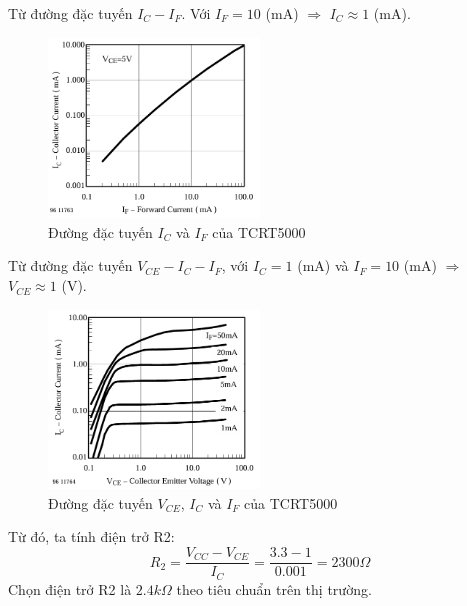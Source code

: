             \hspace*{0.6cm}Từ đường đặc tuyến $I_{C} - I_{F}$. Với $I_{F} = 10$ (mA) $\Rightarrow$ $I_{C} \approx 1$ (mA).
            \begin{figure}[H]
                \centering
                \includegraphics[width=0.5\textwidth]{pictures/chapter4/c4_p4_IC&IF.png}
                \caption{Đường đặc tuyến $I_{C}$ và $I_{F}$ của TCRT5000}
                \label{fig:4-6}
            \end{figure}
            Từ đường đặc tuyến $V_{CE} - I_{C} - I_{F}$, với $I_{C} = 1$ (mA) và $I_{F} = 10$ (mA) $\Rightarrow$ $V_{CE} \approx 1$ (V).\\
            \begin{figure}[H]
                \centering
                \includegraphics[width=0.5\textwidth]{pictures/chapter4/c4_p5_VCE&IC&IF.png}
                \caption{Đường đặc tuyến $V_{CE}$, $I_{C}$ và $I_{F}$ của TCRT5000}
                \label{fig:4-7}
            \end{figure}
            Từ đó, ta tính điện trở R2:
            \begin{equation}
                R_{2} = \frac{V_{CC} - V_{CE}}{I_{C}} = \frac{3.3 - 1}{0.001} = 2300 \Omega
                \label{eq:4-2}
            \end{equation}
            \hspace*{0.6cm}Chọn điện trở R2 là $2.4 k\Omega$ theo tiêu chuẩn trên thị trường.\\[0.4cm]

